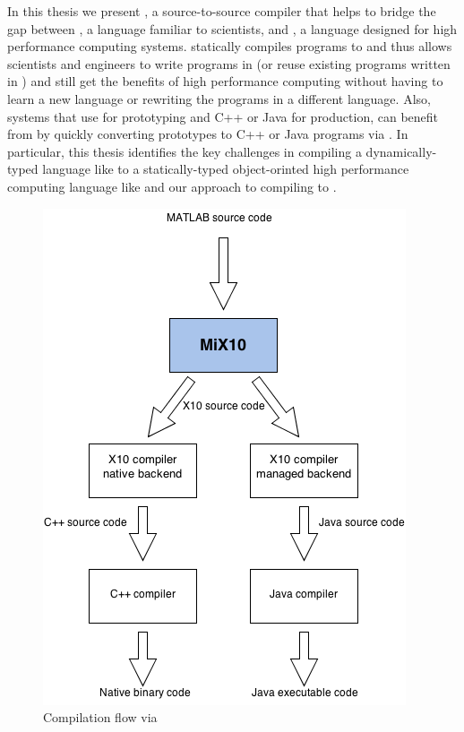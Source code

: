 In this thesis we present \mixten, a source-to-source compiler that helps
to bridge the gap between \matlab, a language familiar to scientists,
and \xten,  a language designed for high performance computing systems. 
\mixten statically compiles \matlab programs to \xten and thus
allows scientists and engineers to write programs in \matlab (or reuse existing 
programs written in \matlab) and still get the benefits of high 
performance computing without having to learn a new language or rewriting the
programs in a different language. Also, systems that
use \matlab for prototyping and C++ or Java for production, can benefit from
\mixten by quickly converting \matlab prototypes to C++ or Java programs via 
\xten. 
In particular, this thesis identifies the key 
challenges in compiling a
dynamically-typed language like \matlab to a statically-typed object-orinted
high performance computing language like \xten and our approach to 
compiling \matlab to \xten.
\begin{figure}[htbp]                                                            
\begin{center}                                                                  
\includegraphics[scale=0.4]{images/mix10_compilation_flow}                             
\caption {Compilation flow via \mixten}\label{Fig:flow}                    
\end{center}                                                                    
\end{figure}     

